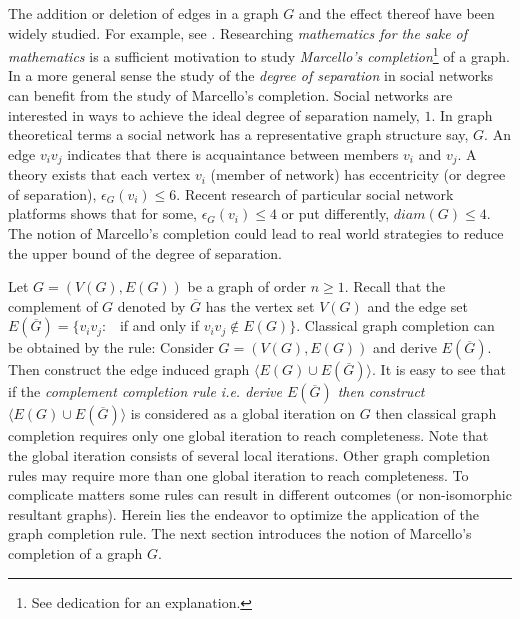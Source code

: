 \documentclass[12pt]{amsart}
\numberwithin{equation}{section}
\numberwithin{equation}{section}
\begin{document}
The addition or deletion of edges in a graph $G$ and the effect thereof have been widely studied. For example, see \cite{faudree, heggernes, majeed, yamuna}. Researching \emph{mathematics for the sake of mathematics} is a sufficient motivation to study \emph{Marcello's completion}\footnote{See dedication for an explanation.} of a graph. In a more general sense the study of the \emph{degree of separation} in social networks can benefit from the study of Marcello's completion. Social networks are interested in ways to achieve the ideal degree of separation namely, $1$. In graph theoretical terms a social network has a representative graph structure say, $G$. An edge $v_iv_j$ indicates that there is acquaintance between members $v_i$ and $v_j$. A theory exists that each vertex $v_i$ (member of network) has eccentricity (or degree of separation), $\epsilon_G(v_i) \leq 6$. Recent research of particular social network platforms shows that for some, $\epsilon_G(v_i) \leq 4$ or put differently, $diam(G) \leq 4$. The notion of Marcello's completion could lead to real world strategies to reduce the upper bound of the degree of separation. 

Let $G = (V(G),E(G))$ be a graph of order $n \geq 1$. Recall that the complement of $G$ denoted by $\overline{G}$ has the vertex set $V(G)$ and the edge set $E(\overline{G}) = \{v_iv_j:$~ if and only if $v_iv_j \notin E(G)\}$. Classical graph completion can be obtained by the rule: Consider $G = (V(G),E(G))$ and derive $E(\overline{G})$. Then construct the edge induced graph $\langle E(G) \cup E(\overline{G})\rangle$. It is easy to see that if the \emph{complement completion rule i.e. derive $E(\overline{G})$ then construct $\langle E(G) \cup E(\overline{G})\rangle$} is considered as a global iteration on $G$  then classical graph completion requires only one global iteration to reach completeness. Note that the global iteration consists of several local iterations. Other graph completion rules may require more than one global iteration to reach completeness. To complicate matters some rules can result in different outcomes (or non-isomorphic resultant graphs). Herein lies the endeavor to optimize the application of the graph completion rule. The next section introduces the notion of Marcello's completion of a graph $G$.
 
\end{document}
